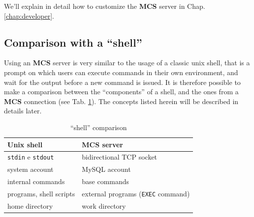 \documentclass[12pt,titlepage]{book}
\newcommand{\mcs}{\textbf{MCS} }
\begin{document}
\noindent We'll explain in detail how to customize the \mcs server in
Chap. \ref{chap:developer}.


\subsection{Comparison with a ``shell''}
Using an \mcs server is very similar to the usage of a classic unix
shell, that is a prompt on which users can execute commands in their
own environment, and wait for the output before a new command is
issued. It is therefore possible to make a comparison between the
``components'' of a shell, and the ones from a \mcs connection (see
Tab. \ref{paragoneshell}). The concepts listed herein will be
described in details later.

%
\begin{table}[hbtp] \begin{center}
    \bigskip
    \begin{tabular}{|l|l|}
      \hline \textbf{Unix shell} & \textbf{MCS server} \\ \hline
      \verb|stdin| e \verb|stdout| & bidirectional TCP socket \\
      system account & MySQL account \\ internal commands & base
      commands \\ programs, shell scripts & external programs
      (\verb|EXEC| command) \\ home directory & work directory \\
      \hline
    \end{tabular}
    \caption{``shell'' comparison}\label{paragoneshell}
\end{center} \end{table}
%
\end{document}
